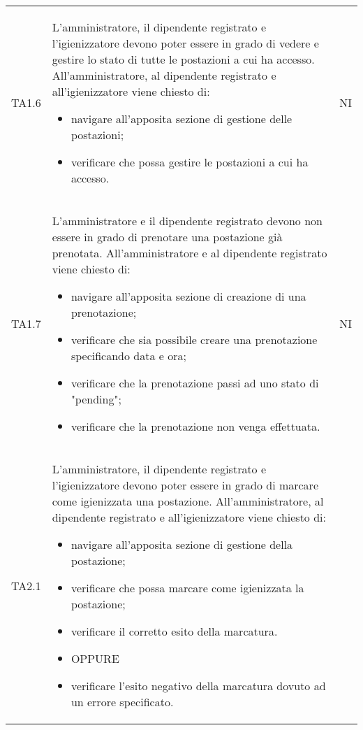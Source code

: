 {\begin{longtable}{ c C{11cm} c }
        TA1.6&
        L'amministratore, il dipendente registrato e l'igienizzatore devono poter essere in grado di vedere e gestire lo stato di tutte le postazioni a cui ha accesso.\newline
        All'amministratore, al dipendente registrato e all'igienizzatore viene chiesto di:
        \begin{itemize}
            \item navigare all'apposita sezione di gestione delle postazioni;
            \item verificare che possa gestire le postazioni a cui ha accesso.
        \end{itemize}&
        NI\\
        TA1.7&
        L'amministratore e il dipendente registrato devono non essere in grado di prenotare una postazione già prenotata.\newline
        All'amministratore e al dipendente registrato viene chiesto di:
        \begin{itemize}
            \item navigare all'apposita sezione di creazione di una prenotazione;
            \item verificare che sia possibile creare una prenotazione specificando data e ora;
            \item verificare che la prenotazione passi ad uno stato di "pending";
            \item verificare che la prenotazione non venga effettuata.
        \end{itemize}&
        NI\\
        TA2.1&
        L'amministratore, il dipendente registrato e l'igienizzatore devono poter essere in grado di marcare come igienizzata una postazione.\newline
        All'amministratore, al dipendente registrato e all'igienizzatore viene chiesto di:
        \begin{itemize}
            \item navigare all'apposita sezione di gestione della postazione;
            \item verificare che possa marcare come igienizzata la postazione;
            \item verificare il corretto esito della marcatura.
            \item [] OPPURE
            \item verificare l'esito negativo della marcatura dovuto ad un errore specificato.
        \end{itemize}&

\end{longtable}}
